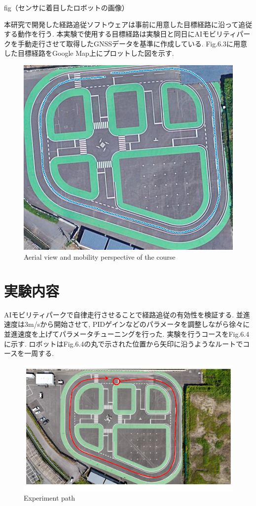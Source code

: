 fig（センサに着目したロボットの画像）

本研究で開発した経路追従ソフトウェアは事前に用意した目標経路に沿って追従する動作を行う.
本実験で使用する目標経路は実験日と同日にAIモビリティパークを手動走行させて取得したGNSSデータを基準に作成している.
Fig.6.3に用意した目標経路をGoogle Map上にプロットした図を示す.

\begin{figure}[H]
  \centering
 \includegraphics[keepaspectratio, scale=0.3]
      {images/targetpath.png}
 \caption{Aerial view and mobility perspective of the course}
 \label{fig:course}
\end{figure}

\section{実験内容}
AIモビリティパークで自律走行させることで経路追従の有効性を検証する.
並進速度は3m/sから開始させて, PIDゲインなどのパラメータを調整しながら徐々に並進速度を上げてパラメータチューニングを行った.
実験を行うコースをFig.6.4に示す.
ロボットはFig.6.4の丸で示された位置から矢印に沿うようなルートでコースを一周する.

\begin{figure}[H]
  \centering
 \includegraphics[keepaspectratio, scale=0.5]
      {images/AIFormulapath.png}
 \caption{Experiment path}
 \label{fig:path}
\end{figure}

